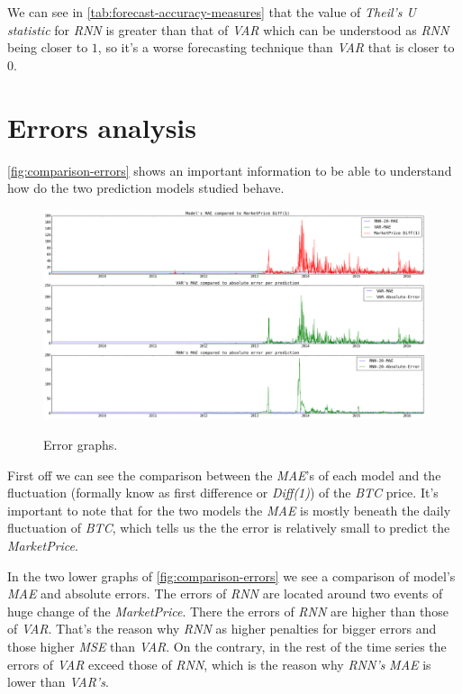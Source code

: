 We can see in \autoref{tab:forecast-accuracy-measures} that the value
of \textit{Theil's U statistic} for \textit{RNN} is greater than that
of \textit{VAR} which can be understood as \textit{RNN} being closer
to $1$, so it's a worse forecasting technique than \textit{VAR} that
is closer to $0$.

\section{Errors analysis}
\label{sec:errors-analysis}

\autoref{fig:comparison-errors} shows an important information to be
able to understand how do the two prediction models studied behave.

\begin{figure}[bth]
  \myfloatalign
  {
    \includegraphics[width=1\linewidth]
    {gfx/comparison-errors}}
  \caption{Error graphs.}
  \label{fig:comparison-errors}
\end{figure}

First off we can see the comparison between the \textit{MAE}'s of each
model and the fluctuation (formally know as first difference or
\textit{Diff(1)}) of the \textit{BTC} price. It's important to note
that for the two models the \textit{MAE} is mostly beneath the daily
fluctuation of \textit{BTC}, which tells us the the error is
relatively small to predict the \textit{MarketPrice}.

In the two lower graphs of \autoref{fig:comparison-errors} we see a
comparison of model's \textit{MAE} and absolute errors. The errors of
\textit{RNN} are located around two events of huge change of the
\textit{MarketPrice}. There the errors of \textit{RNN} are higher than
those of \textit{VAR}. That's the reason why \textit{RNN} as higher
penalties for bigger errors and those higher \textit{MSE} than
\textit{VAR}. On the contrary, in the rest of the time series
the errors of \textit{VAR} exceed those of \textit{RNN}, which is the
reason why \textit{RNN's} \textit{MAE} is lower than \textit{VAR's}.

